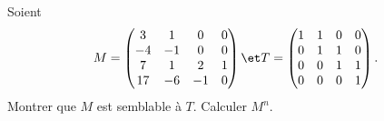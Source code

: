 \begin{enonce}
\begin{exercise}[ID={RMS/124/E1181 écoles des mines PSI},subtitle={},tags={}, difficulty={0}]
Soient 
\begin{equation*}
  M= \begin{pmatrix}
  3&1&0&0\\
  -4&-1&0&0\\
  7&1&2&1\\
  17&-6&-1&0
  \end{pmatrix}
  \et
  T= \begin{pmatrix}
  1&1&0&0\\
  0&1&1&0\\
  0&0&1&1\\
  0&0&0&1
  \end{pmatrix}.
\end{equation*}
Montrer que $M$ est semblable à $T$.
Calculer $M^n$.
\end{exercise}
\begin{solution}
\end{solution}
\end{enonce}
